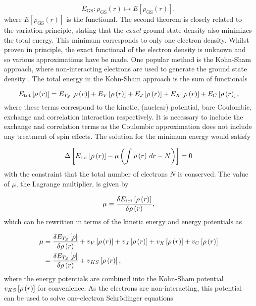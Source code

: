 \begin{equation}
    E_{\text{GS}} : \rho_{\text{GS}} \left(r\right) \mapsto E \left[ \rho_{\text{GS}} \left(r\right)\right],
\end{equation}
%
where $E \left[ \rho_{\text{GS}} \left(r\right)\right]$ is the functional. The second
theorem is closely related to the variation principle, stating that the \emph{exact}
ground state density also minimizes the total energy. This minimum corresponds to 
only one electron density. Whilst proven in principle, the exact functional of the
electron density is unknown and so various approximations have be made. One popular
method is the Kohn-Sham approach, where non-interacting electrons are used to generate
the ground state density \cite{Kohn1965}. The total energy in the Kohn-Sham approach
is the sum of functionals

\begin{equation}
    E_{\text{tot}} \left[ \rho\left(r\right) \right] = E_{T_S} \left[ \rho\left(r\right) \right] + E_{V} \left[ \rho\left(r\right) \right] + E_{J} \left[ \rho\left(r\right) \right] + E_{X} \left[ \rho\left(r\right) \right] + E_{C} \left[ \rho\left(r\right) \right],
\end{equation}
%
where these terms correspond to the kinetic, (nuclear) potential, bare Coulombic,
exchange and correlation interaction respectively. It is necessary to include the 
exchange and correlation terms as the Coulombic approximation does not include any
treatment of spin effects. The solution for the minimum energy would satisfy

\begin{equation}
    \Delta \left[  E_{\text{tot}} \left[ \rho\left(r\right) \right]  - \mu \left( \int_{}^{} \rho\left(r\right) \,dr - N \right) \right] = 0
\end{equation}
%
with the constraint that the total number of electrons $N$ is conserved. The value
of $\mu$, the Lagrange multiplier, is given by

\begin{equation}
    \mu = \frac{\delta  E_{\text{tot}} \left[ \rho\left(r\right) \right]}{\delta \rho\left(r\right)},
\end{equation}
%
which can be rewritten in terms of the kinetic energy and energy potentials as

\begin{equation}
    \begin{split}
        \mu &= \frac{\delta  E_{T_S} \left[ \rho \right]}{\delta \rho\left(r\right)} + v_{V} \left[ \rho\left(r\right) \right] + v_{J} \left[ \rho\left(r\right) \right] + v_{X} \left[ \rho\left(r\right) \right] + v_{C} \left[ \rho\left(r\right) \right] \\
            &= \frac{\delta  E_{T_S} \left[ \rho \right]}{\delta \rho\left(r\right)} + v_{KS} \left[ \rho\left(r\right) \right],
    \end{split}
\end{equation}
%
where the energy potentials are combined into the Kohn-Sham potential $v_{KS} \left[ \rho\left(r\right) \right]$ for
convenience. As the electrons are non-interacting, this potential can be used to
solve one-electron Schrödinger equations

